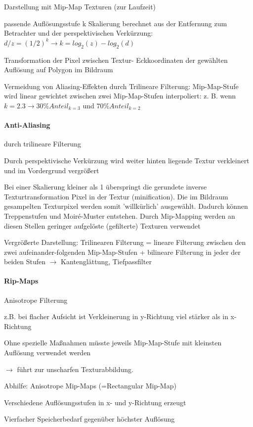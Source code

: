 \documentclass[landscape]{article}
\begin{document}
\begin{multicols}{3}
  Darstellung mit Mip-Map Texturen (zur Laufzeit)
  \begin{itemize*}
    \item passende Auflösungsstufe k Skalierung berechnet aus der Entfernung zum Betrachter und der perspektivischen Verkürzung: $d/z = (1/2)^k \rightarrow k = log_2(z)-log_2(d)$
    \item Transformation der Pixel zwischen Textur- Eckkoordinaten der gewählten Auflösung auf Polygon im Bildraum
    \item Vermeidung von Aliasing-Effekten durch Trilineare Filterung: Mip-Map-Stufe wird linear gewichtet zwischen zwei Mip-Map-Stufen interpoliert: z. B. wenn $k = 2.3 \rightarrow 30\% Anteil_{k=3}$ und $70\% Anteil_{k=2}$
  \end{itemize*}
  
  \paragraph{Anti-Aliasing}
  durch trilineare Filterung
  \begin{itemize*}
    \item Durch perspektivische Verkürzung wird weiter hinten liegende Textur verkleinert und im Vordergrund vergrößert
    \item Bei einer Skalierung kleiner als 1 überspringt die gerundete inverse Texturtransformation Pixel in der Textur (minification). Die im Bildraum gesampelten Texturpixel werden somit 'willkürlich' ausgewählt. Dadurch können Treppenstufen und Moiré-Muster entstehen. Durch Mip-Mapping werden an diesen Stellen geringer aufgelöste (gefilterte) Texturen verwendet
    \item Vergrößerte Darstellung: Trilinearen Filterung = lineare Filterung zwischen den zwei aufeinander-folgenden Mip-Map-Stufen + bilineare Filterung in jeder der beiden Stufen $\rightarrow$ Kantenglättung, Tiefpassfilter
  \end{itemize*}
  
  \paragraph{Rip-Maps}
  Anisotrope Filterung
  \begin{itemize*}
    \item z.B. bei flacher Aufsicht ist Verkleinerung in y-Richtung viel stärker als in x-Richtung
    \item Ohne spezielle Maßnahmen müsste jeweils Mip-Map-Stufe mit kleinsten Auflösung verwendet werden
    \item $\rightarrow$ führt zur unscharfen Texturabbildung.
    \item Abhilfe: Anisotrope Mip-Maps (=Rectangular Mip-Map)
    \item Verschiedene Auflösungsstufen in x- und y-Richtung erzeugt
    \item Vierfacher Speicherbedarf gegenüber höchster Auflösung
  \end{itemize*}
  

\end{multicols}
\end{document}
